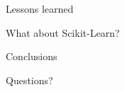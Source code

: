 \documentclass{beamer}
\begin{document}

\begin{frame}{Lessons learned}
\end{frame}


\begin{frame}{What about Scikit-Learn?}
\end{frame}


\begin{frame}{Conclusions}
\end{frame}


\appendix

\begin{frame}
\begin{center}
{\Huge  Questions?}
\end{center}
\end{frame}
\end{document}
